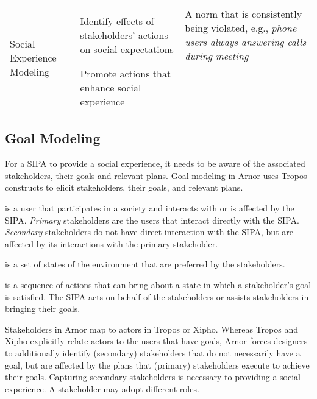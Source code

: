\documentclass[11pt,          %
               phd,           %
               onehalfspacing %
               ]{ncsuthesis}
\newcommand{\fsl}{\textsl}
\newcommand{\frameworkA}{Arnor\xspace}
\begin{document}
\begin{longtable}{@{}p{2.7cm}p{6cm}p{6cm}@{}}
\midrule
\multirow{2}{2.7cm}{Social Experience Modeling} & Identify effects of 
stakeholders' actions on social expectations & A norm that is consistently being violated, e.g., \fsl{phone users always answering calls during meeting}\\
& Promote actions that enhance social experience & 
\\

\bottomrule
\end{longtable}

\subsection{Goal Modeling}

For a SIPA to provide a social experience, it needs to be aware of
the associated stakeholders, their goals and relevant plans. Goal
modeling in \frameworkA uses Tropos constructs to elicit stakeholders,
their goals, and relevant plans.

\begin{description}[leftmargin=1em]
\item[A stakeholder] is a user that participates in a society and 
interacts with or is affected by the SIPA.  \emph{Primary} stakeholders 
are the users that interact directly with the SIPA.  \emph{Secondary} 
stakeholders do not have direct interaction with the SIPA, but are 
affected by its interactions with the primary stakeholder.  

\item[A goal] is a set of states of the environment that are 
preferred by the stakeholders. 

\item[A plan] is a sequence of actions that can bring about a state in
which a stakeholder's goal is satisfied. The SIPA acts on behalf of the
stakeholders or assists stakeholders in bringing their goals.

\end{description}

Stakeholders in \frameworkA map to actors in Tropos or Xipho.
Whereas Tropos and Xipho explicitly relate actors to the users that
have goals, \frameworkA forces designers to additionally identify (secondary)
stakeholders that do not necessarily have a goal, but are affected by
the plans that (primary) stakeholders execute to achieve their
goals. Capturing secondary stakeholders is necessary to providing a 
social experience. A stakeholder may adopt different roles.
\end{document}
